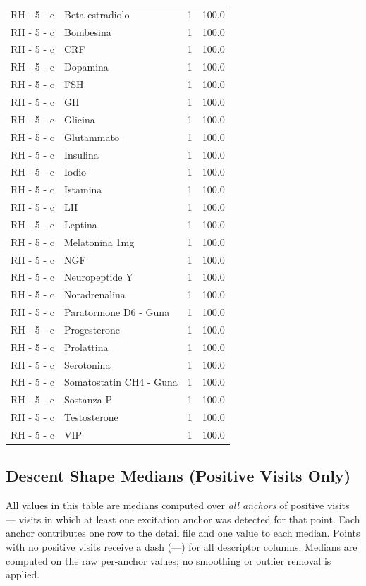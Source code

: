 \documentclass[a4paper,11pt]{article}
\begin{document}
\begin{footnotesize}
\begin{longtable}{p{3.5cm}p{7.5cm}rr}
RH - 5 - c & Beta estradiolo & 1 & 100.0 \\
RH - 5 - c & Bombesina & 1 & 100.0 \\
RH - 5 - c & CRF & 1 & 100.0 \\
RH - 5 - c & Dopamina & 1 & 100.0 \\
RH - 5 - c & FSH & 1 & 100.0 \\
RH - 5 - c & GH & 1 & 100.0 \\
RH - 5 - c & Glicina & 1 & 100.0 \\
RH - 5 - c & Glutammato & 1 & 100.0 \\
RH - 5 - c & Insulina & 1 & 100.0 \\
RH - 5 - c & Iodio & 1 & 100.0 \\
RH - 5 - c & Istamina & 1 & 100.0 \\
RH - 5 - c & LH & 1 & 100.0 \\
RH - 5 - c & Leptina & 1 & 100.0 \\
RH - 5 - c & Melatonina 1mg & 1 & 100.0 \\
RH - 5 - c & NGF & 1 & 100.0 \\
RH - 5 - c & Neuropeptide Y & 1 & 100.0 \\
RH - 5 - c & Noradrenalina & 1 & 100.0 \\
RH - 5 - c & Paratormone D6 - Guna & 1 & 100.0 \\
RH - 5 - c & Progesterone & 1 & 100.0 \\
RH - 5 - c & Prolattina & 1 & 100.0 \\
RH - 5 - c & Serotonina & 1 & 100.0 \\
RH - 5 - c & Somatostatin CH4 - Guna & 1 & 100.0 \\
RH - 5 - c & Sostanza P & 1 & 100.0 \\
RH - 5 - c & Testosterone & 1 & 100.0 \\
RH - 5 - c & VIP & 1 & 100.0 \\
\end{longtable}
\end{footnotesize}

\subsection{Descent Shape Medians (Positive Visits Only)}

All values in this table are medians computed over \emph{all anchors} of positive visits ---
visits in which at least one excitation anchor was detected for that point. Each anchor
contributes one row to the detail file and one value to each median. Points with no positive
visits receive a dash (---) for all descriptor columns.
Medians are computed on the raw per-anchor values; no smoothing or outlier removal is
applied.
\end{document}
